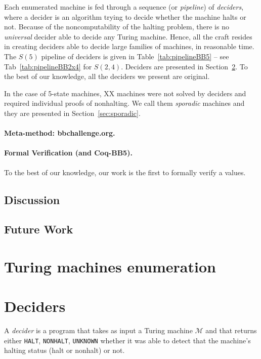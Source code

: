 \documentclass[a4paper,british]{article}
\theoremstyle{definition} %
\numberwithin{equation}{section}
\theoremstyle{definition} %
\newcommand{\ts}[1]{{\color{red}#1}}
\newcommand{\numSporadic}{\ts{XX}\xspace}
\newcommand{\HALT}{\texttt{HALT}\xspace}
\newcommand{\NONHALT}{\texttt{NONHALT}\xspace}
\newcommand{\UNKNOWN}{\texttt{UNKNOWN}\xspace}
\newcommand{\CoqBB}{Coq-BB5\xspace}
\begin{document}
Each enumerated machine is fed through a sequence (or \textit{pipeline}) of \textit{deciders}, where a decider is an algorithm trying to decide whether the machine halts or not. Because of the noncomputability of the halting problem, there is no \textit{universal} decider able to decide any Turing machine. Hence, all the craft resides in creating deciders able to decide large families of machines, in reasonable time. The $S(5)$ pipeline of deciders is given in Table~\ref{tab:pipelineBB5} -- see Tab~\ref{tab:pipelineBB2x4} for $S(2,4)$. Deciders are presented in Section~\ref{sec:deciders}. To the best of our knowledge, all the deciders we present are original.

In the case of 5-state machines, \numSporadic machines were not solved by deciders and required individual proofs of nonhalting. We call them \textit{sporadic} machines and they are presented in Section~\ref{sec:sporadic}.

\paragraph{Meta-method: bbchallenge.org.}

\paragraph{Formal Verification (\Coq and \CoqBB).} To the best of our knowledge, our work is the first to formally verify a \BBfull values.

\subsection{Discussion}
\subsection{Future Work}



\section{Turing machines enumeration}\label{sec:enum}
\section{Deciders}\label{sec:deciders}

A \textit{decider} is a program that takes as input a Turing machine $\mathcal{M}$ and that returns either \HALT, \NONHALT, \UNKNOWN whether it was able to detect that the machine's halting status (halt or nonhalt) or not.
\end{document}

